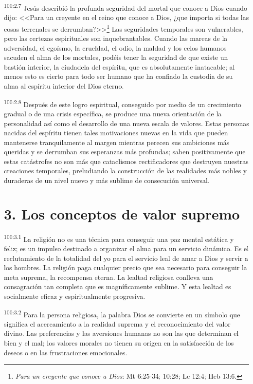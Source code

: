 \documentclass[twoside, 11pt]{book}
\begin{document}
\par
\textsuperscript{100:2.7} Jesús describió la profunda seguridad del mortal que conoce a Dios cuando dijo: <<Para un creyente en el reino que conoce a Dios, ¿que importa si todas las cosas terrenales se derrumban?>>\footnote{\textit{Para un creyente que conoce a Dios}: Mt 6:25-34; 10:28; Lc 12:4; Heb 13:6.} Las seguridades temporales son vulnerables, pero las certezas espirituales son inquebrantables. Cuando las mareas de la adversidad, el egoísmo, la crueldad, el odio, la maldad y los celos humanos sacuden el alma de los mortales, podéis tener la seguridad de que existe un bastión interior, la ciudadela del espíritu, que es absolutamente inatacable; al menos esto es cierto para todo ser humano que ha confiado la custodia de su alma al espíritu interior del Dios eterno.

\par
\textsuperscript{100:2.8} Después de este logro espiritual, conseguido por medio de un crecimiento gradual o de una crisis específica, se produce una nueva orientación de la personalidad así como el desarrollo de una nueva escala de valores. Estas personas nacidas del espíritu tienen tales motivaciones nuevas en la vida que pueden mantenerse tranquilamente al margen mientras perecen sus ambiciones más queridas y se derrumban sus esperanzas más profundas; saben positivamente que estas catástrofes no son más que cataclismos rectificadores que destruyen nuestras creaciones temporales, preludiando la construcción de las realidades más nobles y duraderas de un nivel nuevo y más sublime de consecución universal.

\section*{3. Los conceptos de valor supremo}
\par
\textsuperscript{100:3.1} La religión no es una técnica para conseguir una paz mental estática y feliz; es un impulso destinado a organizar el alma para un servicio dinámico. Es el reclutamiento de la totalidad del yo para el servicio leal de amar a Dios y servir a los hombres. La religión paga cualquier precio que sea necesario para conseguir la meta suprema, la recompensa eterna. La lealtad religiosa conlleva una consagración tan completa que es magníficamente sublime. Y esta lealtad es socialmente eficaz y espiritualmente progresiva.

\par
\textsuperscript{100:3.2} Para la persona religiosa, la palabra Dios se convierte en un símbolo que significa el acercamiento a la realidad suprema y el reconocimiento del valor divino. Las preferencias y las aversiones humanas no son las que determinan el bien y el mal; los valores morales no tienen su origen en la satisfacción de los deseos o en las frustraciones emocionales.
\end{document}
